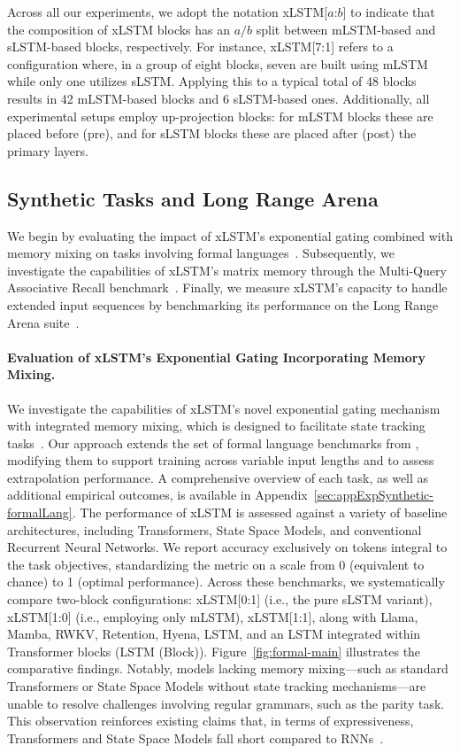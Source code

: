Across all our experiments, we adopt the notation xLSTM[$a$:$b$] to indicate that the composition of xLSTM blocks has an $a/b$ split between mLSTM-based and sLSTM-based blocks, respectively. For instance, xLSTM[7:1] refers to a configuration where, in a group of eight blocks, seven are built using mLSTM while only one utilizes sLSTM. Applying this to a typical total of 48 blocks results in 42 mLSTM-based blocks and 6 sLSTM-based ones. Additionally, all experimental setups employ up-projection blocks: for mLSTM blocks these are placed before (pre), and for sLSTM blocks these are placed after (post) the primary layers.

\subsection{Synthetic Tasks and Long Range Arena}
\label{sec:ExpSyntethic}
We begin by evaluating the impact of xLSTM’s exponential gating combined with memory mixing on tasks involving formal languages~\citep{Deletang:23}. Subsequently, we investigate the capabilities of xLSTM’s matrix memory through the Multi-Query Associative Recall benchmark~\citep{Arora:23arxiv}. Finally, we measure xLSTM’s capacity to handle extended input sequences by benchmarking its performance on the Long Range Arena suite~\citep{Tay:21}.

\paragraph{Evaluation of xLSTM's Exponential Gating Incorporating Memory Mixing.} We investigate the capabilities of xLSTM's novel exponential gating mechanism with integrated memory mixing, which is designed to facilitate state tracking tasks~\citep{Merrill:24, Merrill:23}. Our approach extends the set of formal language benchmarks from \citet{Deletang:23}, modifying them to support training across variable input lengths and to assess extrapolation performance. A comprehensive overview of each task, as well as additional empirical outcomes, is available in Appendix~\ref{sec:appExpSynthetic-formalLang}. 
The performance of xLSTM is assessed against a variety of baseline architectures, including Transformers, State Space Models, and conventional Recurrent Neural Networks. We report accuracy exclusively on tokens integral to the task objectives, standardizing the metric on a scale from 0 (equivalent to chance) to 1 (optimal performance). Across these benchmarks, we systematically compare two-block configurations: xLSTM[0:1] (i.e., the pure sLSTM variant), xLSTM[1:0] (i.e., employing only mLSTM), xLSTM[1:1], along with Llama, Mamba, RWKV, Retention, Hyena, LSTM, and an LSTM integrated within Transformer blocks (LSTM (Block)). Figure~\ref{fig:formal-main} illustrates the comparative findings. Notably, models lacking memory mixing—such as standard Transformers or State Space Models without state tracking mechanisms—are unable to resolve challenges involving regular grammars, such as the parity task. This observation reinforces existing claims that, in terms of expressiveness, Transformers and State Space Models fall short compared to RNNs~\citep{Merrill:24, Merrill:23, Deletang:23}.

